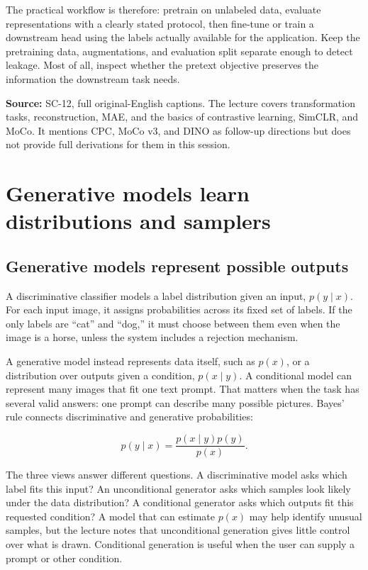 The practical workflow is therefore: pretrain on unlabeled data, evaluate representations with a clearly stated protocol, then fine-tune or train a downstream head using the labels actually available for the application. Keep the pretraining data, augmentations, and evaluation split separate enough to detect leakage. Most of all, inspect whether the pretext objective preserves the information the downstream task needs.

\textbf{Source:} SC-12, full original-English captions. The lecture covers transformation tasks, reconstruction, MAE, and the basics of contrastive learning, SimCLR, and MoCo. It mentions CPC, MoCo v3, and DINO as follow-up directions but does not provide full derivations for them in this session.

\section{Generative models learn distributions and samplers}\label{04-visual-computing-ii-ch031-generative-models-learn-distributions-and-samplers}

\subsection{Generative models represent possible outputs}\label{04-visual-computing-ii-ch031-generative-models-represent-possible-outputs}

A discriminative classifier models a label distribution given an input, \(p(y\mid x)\). For each input image, it assigns probabilities across its fixed set of labels. If the only labels are ``cat'' and ``dog,'' it must choose between them even when the image is a horse, unless the system includes a rejection mechanism.

A generative model instead represents data itself, such as \(p(x)\), or a distribution over outputs given a condition, \(p(x\mid y)\). A conditional model can represent many images that fit one text prompt. That matters when the task has several valid answers: one prompt can describe many possible pictures. Bayes' rule connects discriminative and generative probabilities:

\[
p(y\mid x)=\frac{p(x\mid y)p(y)}{p(x)}.
\]

The three views answer different questions. A discriminative model asks which label fits this input? An unconditional generator asks which samples look likely under the data distribution? A conditional generator asks which outputs fit this requested condition? A model that can estimate \(p(x)\) may help identify unusual samples, but the lecture notes that unconditional generation gives little control over what is drawn. Conditional generation is useful when the user can supply a prompt or other condition.

